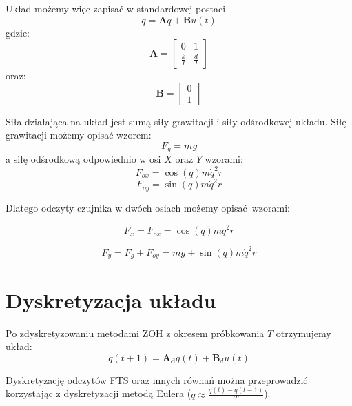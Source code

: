 \documentclass[a4paper, 10pt]{article}
\begin{document}
Układ możemy więc zapisać w standardowej postaci
\begin{equation}
\dot{q} = \textbf{A}q + \textbf{B}u(t)
\end{equation}
gdzie:
\begin{equation}
\mathbf{A} = 	\begin{bmatrix}
	    0 & 1 \\
	    \frac{k}{I} & \frac{d}{I}
	\end{bmatrix}
\end{equation}
oraz:
\begin{equation}
\mathbf{B} = \begin{bmatrix}
	    0 \\
	    1
	\end{bmatrix}
\end{equation}

Siła działająca na układ jest sumą siły grawitacji i siły odśrodkowej układu.
Siłę grawitacji możemy opisać wzorem:
\begin{equation}
F_g = mg
\end{equation}
a siłę odśrodkową odpowiednio w osi $X$ oraz $Y$ wzorami:
\begin{equation}
F_{ox} =  \cos{(q)}m\dot{q}^2 r
\end{equation}
\begin{equation}
F_{oy} =  \sin{(q)}m\dot{q}^2 r
\end{equation}


Dlatego odczyty czujnika w dwóch osiach możemy opisać wzorami:

\begin{equation}
F_x = F_{ox} = \cos{(q)}m\dot{q}^2 r
\end{equation}

\begin{equation}
\label{eq:fy}
F_y = F_g + F_{oy} = mg + \sin{(q)}m\dot{q}^2 r
\end{equation}


\section{Dyskretyzacja układu}
Po zdyskretyzowaniu metodami ZOH z okresem próbkowania $T$ otrzymujemy układ:
\begin{equation}
q(t+1) = \mathbf{A_d}q(t) + \mathbf{B}_du(t)
\label{eq:dyskretny}
\end{equation}

Dyskretyzację odczytów FTS  oraz innych równań można przeprowadzić korzystając z dyskretyzacji metodą Eulera ($\dot{q} \approx \frac{q(t)-q(t-1)}{T}$).
\end{document}
